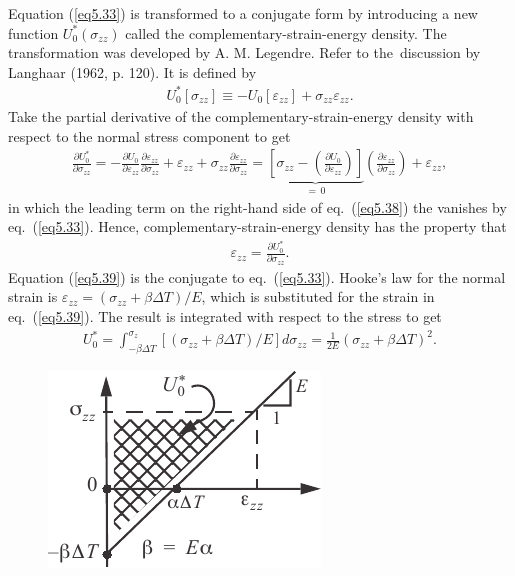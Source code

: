 \documentclass{AeroStructure-ERJohnson}
\begin{document}
Equation (\ref{eq5.33}) is transformed to a conjugate form by introducing a new function $U_{0}^{*}\left(\sigma_{z z}\right)$ called the complementary-strain-energy density. The transformation was developed by A. M. Legendre. Refer to the~dis\-cussion by Langhaar (1962, p. 120). It is defined by
\begin{align}\label{eq5.37}
U_{0}^{*}\left[\sigma_{z z}\right] \equiv-U_{0}\left[\varepsilon_{z z}\right]+\sigma_{z z} \varepsilon_{z z}.
\end{align}
Take the partial derivative of the complementary-strain-energy density with respect to the normal stress component to get
\begin{align}\label{eq5.38}
\frac{\partial U_{0}^{*}}{\partial \sigma_{z z}}=-\frac{\partial U_{0}}{\partial \varepsilon_{z z}} \frac{\partial \varepsilon_{z z}}{\partial \sigma_{z z}}+\varepsilon_{z z}+\sigma_{z z} \frac{\partial \varepsilon_{z z}}{\partial \sigma_{z z}}=\underbrace{\left[\sigma_{z z}-\left(\frac{\partial U_{0}}{\partial \varepsilon_{z z}}\right)\right]}_{=\,0}\left(\frac{\partial \varepsilon_{z z}}{\partial \sigma_{z z}}\right)+\varepsilon_{z z},
\end{align}
in which the leading term on the right-hand side of eq.~(\ref{eq5.38}) the vanishes by eq.~(\ref{eq5.33}). Hence, complementary-strain-energy density has the property that
\begin{align}\label{eq5.39}
\varepsilon_{z z}=\frac{\partial U_{0}^{*}}{\partial \sigma_{z z}}.
\end{align}
Equation (\ref{eq5.39}) is the conjugate to eq.~(\ref{eq5.33}). Hooke's law for the normal strain is $\varepsilon_{z z}=\left(\sigma_{z z}+\beta \Delta T\right) / E$, which is substituted for the strain in eq.~(\ref{eq5.39}). The result is integrated with respect to the stress to get
\begin{align}\label{eq5.40}
U_{0}^{*}=\int_{-\beta \Delta T}^{\sigma_{z}}\left[\left(\sigma_{z z}+\beta \Delta T\right) / E\right] d \sigma_{z z}=\frac{1}{2 E}\left(\sigma_{z z}+\beta \Delta T\right)^{2}.
\end{align}

\begin{figure}
\vspace{-25pt}
\includegraphics{Figure_5-9.pdf}
\caption{ \label{fig5.9}}
\end{figure}
\end{document}
